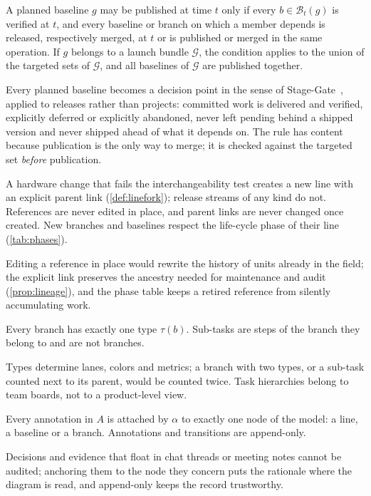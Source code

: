 \begin{hpbrule}
  \label{rule:gate}
  A planned baseline $g$ may be published at time $t$ only if every
  $b \in \mathcal{B}_t(g)$ is verified at $t$, and every baseline or branch
  on which a member depends is released, respectively merged, at $t$ or is
  published or merged in the same operation. If $g$ belongs to a launch
  bundle $\mathcal{G}$, the condition applies to the union of the targeted
  sets of $\mathcal{G}$, and all baselines of $\mathcal{G}$ are published
  together.
\end{hpbrule}
\noindent Every planned baseline becomes a decision point in the sense of
Stage-Gate~\citep{cooper1990stagegate}, applied to releases rather than
projects: committed work is delivered and verified, explicitly deferred or
explicitly abandoned, never left pending behind a shipped version and
never shipped ahead of what it depends on. The rule has content because
publication is the only way to merge; it is checked against the targeted
set \emph{before} publication.

\begin{hpbrule}
  \label{rule:lineage}
  A hardware change that fails the interchangeability test creates a new
  line with an explicit parent link (\cref{def:linefork}); release streams
  of any kind do not. References are never edited in place, and parent
  links are never changed once created. New branches and baselines respect
  the life-cycle phase of their line (\cref{tab:phases}).
\end{hpbrule}
\noindent Editing a reference in place would rewrite the history of units
already in the field; the explicit link preserves the ancestry needed for
maintenance and audit (\cref{prop:lineage}), and the phase table keeps a
retired reference from silently accumulating work.

\begin{hpbrule}
  \label{rule:typed}
  Every branch has exactly one type $\tau(b)$. Sub-tasks are steps of the
  branch they belong to and are not branches.
\end{hpbrule}
\noindent Types determine lanes, colors and metrics; a branch with two
types, or a sub-task counted next to its parent, would be counted twice.
Task hierarchies belong to team boards, not to a product-level view.

\begin{hpbrule}
  \label{rule:discussion}
  Every annotation in $A$ is attached by $\alpha$ to exactly one node of the
  model: a line, a baseline or a branch. Annotations and transitions are
  append-only.
\end{hpbrule}
\noindent Decisions and evidence that float in chat threads or meeting
notes cannot be audited; anchoring them to the node they concern puts the
rationale where the diagram is read, and append-only keeps the record
trustworthy.

